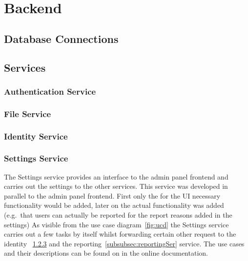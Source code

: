 \section{Backend}

\subsection{Database Connections}

\subsection{Services}

\subsubsection{Authentication Service}

\subsubsection{File Service}

\subsubsection{Identity Service}
\label{subsubsec:identitySer}

\subsubsection{Settings Service}
\label{subsubsec:settingsSer}
The Settings service provides an interface to the admin panel frontend and carries out the settings to the other services.
This service was developed in parallel to the admin panel frontend. %
First only the for the UI necessary functionality would be added, later on the actual functionality was added (e.g.\ that users can actually be reported for the report reasons added in the settings)
As visible from the use case diagram~\ref{fig:ucd} the Settings service carries out a few tasks by itself whilst forwarding
certain other request to the identity ~\ref{subsubsec:identitySer} and the reporting~\ref{subsubsec:reportingSer} service.
The use cases and their descriptions can be found on in the online documentation.


